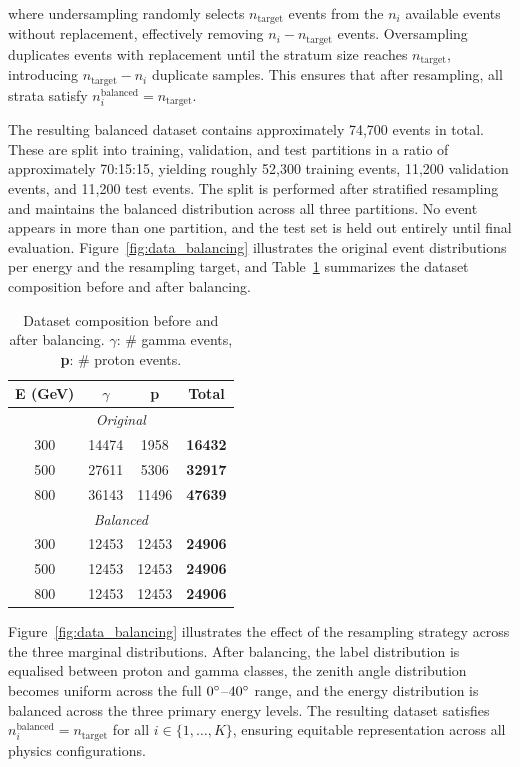 where undersampling randomly selects $n_{\text{target}}$ events from the $n_i$ available events without replacement, effectively removing $n_i - n_{\text{target}}$ events. Oversampling duplicates events with replacement until the stratum size reaches $n_{\text{target}}$, introducing $n_{\text{target}} - n_i$ duplicate samples. This ensures that after resampling, all strata satisfy $n_i^{\text{balanced}} = n_{\text{target}}$.

The resulting balanced dataset contains approximately 74,700 events in total. These are split into training, validation, and test partitions in a ratio of approximately 70:15:15, yielding roughly 52,300 training events, 11,200 validation events, and 11,200 test events. The split is performed after stratified resampling and maintains the balanced distribution across all three partitions. No event appears in more than one partition, and the test set is held out entirely until final evaluation. Figure~\ref{fig:data_balancing} illustrates the original event distributions per energy and the resampling target, and Table~\ref{tab:dataset_balancing} summarizes the dataset composition before and after balancing.
\begin{table}[ht!]
\centering
\caption[Dataset composition before and after balancing.]{Dataset composition before and after balancing. $\gamma$: \# gamma events, \textbf{p}: $\#$ proton events.}
\label{tab:dataset_balancing}
\begin{tabular}{cccc}
\toprule
\textbf{E (GeV)} & \textbf{$\gamma$} & \textbf{p} & \textbf{Total} \\
\midrule
\multicolumn{4}{c}{\textit{Original}} \\
300  & 14474 & 1958 & \textbf{16432} \\
500  & 27611 & 5306 & \textbf{32917} \\
800 & 36143 & 11496 & \textbf{47639} \\
\midrule
\multicolumn{4}{c}{\textit{Balanced}} \\
300  & 12453 & 12453 & \textbf{24906} \\
500  & 12453 & 12453 & \textbf{24906} \\
800  & 12453 & 12453 & \textbf{24906} \\
\bottomrule
\end{tabular}
\end{table}

Figure~\ref{fig:data_balancing} illustrates the effect of the resampling strategy across the three marginal distributions. After balancing, the label distribution is equalised between proton and gamma classes, the zenith angle distribution becomes uniform across the full $0\degree$--$40\degree$ range, and the energy distribution is balanced across the three primary energy levels. The resulting dataset satisfies $n_i^{\text{balanced}} = n_{\text{target}}$ for all $i \in \{1, \ldots, K\}$, ensuring equitable representation across all physics configurations.

